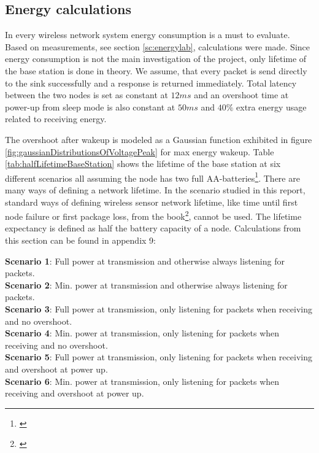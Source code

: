 \subsection{Energy calculations}\label{sc:energyCalculations}

In every wireless network system energy consumption is a must to evaluate. Based on measurements, see section \ref{sc:energylab}, calculations were made. Since energy consumption is not the main investigation of the project, only lifetime of the base station is done in theory. We assume, that every packet is send directly to the sink successfully and a response is returned immediately. Total latency between the two nodes is set as constant at $12 ms$ and an overshoot time at power-up from sleep mode is also constant at $50 ms$ and $40\%$ extra energy usage related to receiving energy.

\noindent The overshoot after wakeup is modeled as a Gaussian function exhibited in figure \ref{fig:gaussianDistributionsOfVoltagePeak} for max energy wakeup. Table \ref{tab:halfLifetimeBaseStation} shows the lifetime of the base station at six different scenarios all assuming the node has two full AA-batteries\footnote{\cite{Wikipedia20180528at1231}}. There are many ways of defining a network lifetime. In the scenario studied in this report, standard ways of defining wireless sensor network lifetime, like time until first node failure or first package loss, from the book\footnote{\cite[p.~65]{Karl2006}}, cannot be used. The lifetime expectancy is defined as half the battery capacity of a node. Calculations from this section can be found in appendix 9:

\noindent \textbf{Scenario 1}: Full power at transmission and otherwise always listening for packets.\\
\textbf{Scenario 2}: Min. power at transmission and otherwise always listening for packets.\\
\textbf{Scenario 3}: Full power at transmission, only listening for packets when receiving and no overshoot.\\
\textbf{Scenario 4}: Min. power at transmission, only listening for packets when receiving and no overshoot.\\
\textbf{Scenario 5}: Full power at transmission, only listening for packets when receiving and overshoot at power up.\\
\textbf{Scenario 6}: Min. power at transmission, only listening for packets when receiving and overshoot at power up.\\

